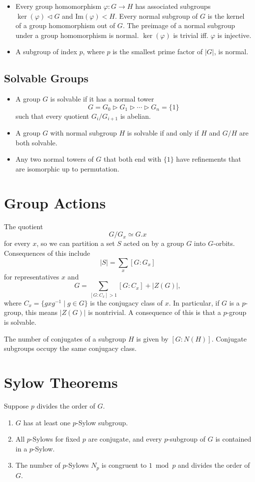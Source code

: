 \documentclass{article}
\begin{document}
\begin{itemize}
  \item{
    Every group homomorphism $\varphi : G \to H$ has associated
    subgroups $\ker(\varphi) \triangleleft G$ and
    $\mathrm{Im}(\varphi) < H$. Every normal subgroup of $G$ is the
    kernel of a group homomorphism out of $G$. The preimage of a
    normal subgroup under a group homomorphism is normal.
    $\ker(\varphi)$ is trivial iff. $\varphi$ is injective.
  }
  \item{
    A subgroup of index $p$, where $p$ is the smallest prime factor of
    $|G|$, is normal.
  }
\end{itemize}

\subsection{Solvable Groups}
\begin{itemize}
  \item{
    A group $G$ is solvable if it has a normal tower
    $$
    G
  = G_0    \triangleright
    G_1    \triangleright
    \cdots \triangleright
    G_n
  = \{ 1 \}
    $$
    such that every quotient $G_i / G_{i+1}$ is abelian.
  }
  \item{
    A group $G$ with normal subgroup $H$ is solvable if and only if
    $H$ and $G / H$ are both solvable.
  }
  \item{
    Any two normal towers of $G$ that both end with $\{1\}$ have
    refinements that are isomorphic up to permutation.
  }
\end{itemize}

\section{Group Actions}
The quotient
$$
G / G_x \simeq G . x
$$
for every $x$, so we can partition a set $S$ acted on by a group $G$
into $G$-orbits. Consequences of this include
$$
|S| = \sum_{x} [G : G_x]
$$
for representatives $x$ and
$$
G = \sum_{[G : C_x] > 1} [G : C_x] + |Z(G)|,
$$
where $C_x = \{gxg^{-1} \mid g \in G\}$ is the conjugacy class of
$x$. In particular, if $G$ is a $p$-group, this means $|Z(G)|$ is
nontrivial. A consequence of this is that a $p$-group is solvable.

The number of conjugates of a subgroup $H$ is given by $[G : N(H)]$.
Conjugate subgroups occupy the same conjugacy class.

\section{Sylow Theorems}
Suppose $p$ divides the order of $G$.
\begin{enumerate}
  \item{
    $G$ has at least one $p$-Sylow subgroup.
  }
  \item{
    All $p$-Sylows for fixed $p$ are conjugate, and every $p$-subgroup
    of $G$ is contained in a $p$-Sylow.
  }
  \item{
    The number of $p$-Sylows $N_p$ is congruent to $1 \bmod p$ and
    divides the order of $G$.
  }
\end{enumerate}
\end{document}
